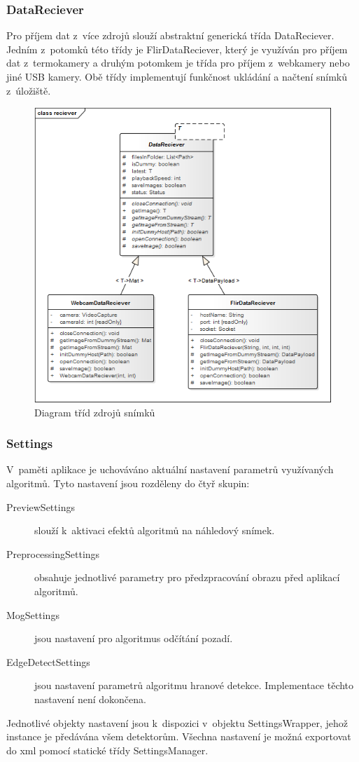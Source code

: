     \subsubsection{DataReciever}
    Pro příjem dat z~více zdrojů slouží abstraktní generická třída DataReciever. Jedním z~potomků této třídy je FlirDataReciever, který je využíván pro příjem dat z~termokamery a druhým potomkem je třída pro příjem z~webkamery nebo jiné USB kamery. Obě třídy implementují funkčnost ukládání a načtení snímků z~úložiště.

    \begin{figure}[h]
      \centering
      \includegraphics[width=1\textwidth]{images/ea_class_reciever.png}
      \caption{Diagram tříd zdrojů snímků}
      \label{fig:ea_class_reciever}
    \end{figure} 
    
    \subsubsection{Settings}
    V~paměti aplikace je uchováváno aktuální nastavení parametrů využívaných algoritmů. Tyto nastavení jsou rozděleny do čtyř skupin:
    \begin{description}
    \item [PreviewSettings] slouží k~aktivaci efektů algoritmů na náhledový snímek.
    \item [PreprocessingSettings] obsahuje jednotlivé parametry pro předzpracování obrazu před aplikací algoritmů.
    \item [MogSettings] jsou nastavení pro algoritmus odčítání pozadí.
    \item [EdgeDetectSettings] jsou nastavení parametrů algoritmu hranové detekce. Implementace těchto nastavení není dokončena.
    \end{description}
    Jednotlivé objekty nastavení jsou k~dispozici v~objektu SettingsWrapper, jehož instance je předávána všem detektorům. Všechna nastavení je možná exportovat do xml pomocí statické třídy SettingsManager.
    
